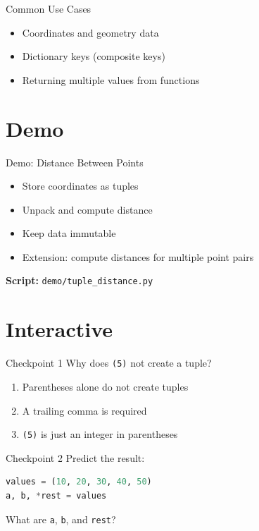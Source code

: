 \documentclass{beamer}
\begin{document}
\begin{frame}[fragile]{Common Use Cases}
  \begin{itemize}[<+->]
    \item Coordinates and geometry data
    \item Dictionary keys (composite keys)
    \item Returning multiple values from functions
  \end{itemize}
\end{frame}

\section{Demo}
\label{sec:demo}

\begin{frame}[fragile]{Demo: Distance Between Points}
  \begin{itemize}[<+->]
    \item Store coordinates as tuples
    \item Unpack and compute distance
    \item Keep data immutable
    \item Extension: compute distances for multiple point pairs
  \end{itemize}
  \vspace{0.4em}
  \textbf{Script:} \texttt{demo/tuple\_distance.py}
\end{frame}

\section{Interactive}
\label{sec:interactive}

\begin{frame}[fragile]{Checkpoint 1}
  Why does \texttt{(5)} not create a tuple?
  \begin{enumerate}[<+->]
    \item Parentheses alone do not create tuples
    \item A trailing comma is required
    \item \texttt{(5)} is just an integer in parentheses
  \end{enumerate}
\end{frame}

\begin{frame}[fragile]{Checkpoint 2}
  Predict the result:
  \begin{lstlisting}[language=Python]
values = (10, 20, 30, 40, 50)
a, b, *rest = values
  \end{lstlisting}
  What are \texttt{a}, \texttt{b}, and \texttt{rest}?
\end{frame}
\end{document}
